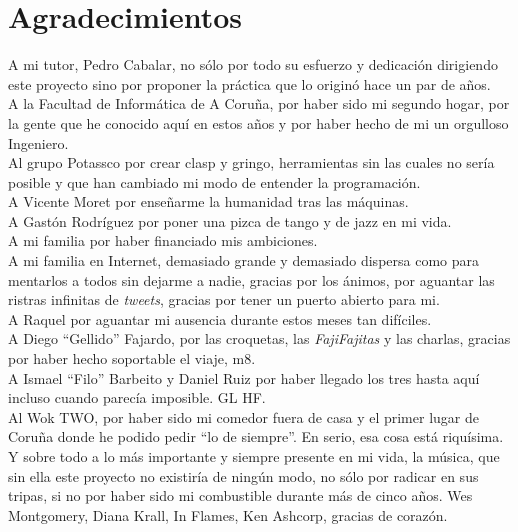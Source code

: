 \thispagestyle{empty}
\section*{Agradecimientos}
A mi tutor, Pedro Cabalar, no sólo por todo su esfuerzo y dedicación dirigiendo este proyecto sino por proponer la práctica que lo originó hace un par de años. \\
A la Facultad de Informática de A Coruña, por haber sido mi segundo hogar, por la gente que he conocido aquí en estos años y por haber hecho de mi un orgulloso Ingeniero. \\
Al grupo Potassco por crear clasp y gringo, herramientas sin las cuales no sería posible y que han cambiado mi modo de entender la programación. \\
A Vicente Moret por enseñarme la humanidad tras las máquinas. \\
A Gastón Rodríguez por poner una pizca de tango y de jazz en mi vida. \\
A mi familia por haber financiado mis ambiciones. \\
A mi familia en Internet, demasiado grande y demasiado dispersa como para mentarlos a todos sin dejarme a nadie, gracias por los ánimos, por aguantar las ristras infinitas de \textit{tweets}, gracias por tener un puerto abierto para mi. \\
A Raquel por aguantar mi ausencia durante estos meses tan difíciles. \\
A Diego ``Gellido'' Fajardo, por las croquetas, las \textit{FajiFajitas} y las charlas, gracias por haber hecho soportable el viaje, m8. \\
A Ismael ``Filo'' Barbeito y Daniel Ruiz por haber llegado los tres hasta aquí incluso cuando parecía imposible. GL HF. \\
Al Wok TWO, por haber sido mi comedor fuera de casa y el primer lugar de Coruña donde he podido pedir ``lo de siempre''. En serio, esa cosa está riquísima. \\
Y sobre todo a lo más importante y siempre presente en mi vida, la música, que sin ella este proyecto no existiría de ningún modo, no sólo por radicar en sus tripas, si no por haber sido mi combustible durante más de cinco años. Wes Montgomery, Diana Krall, In Flames, Ken Ashcorp, gracias de corazón. \\